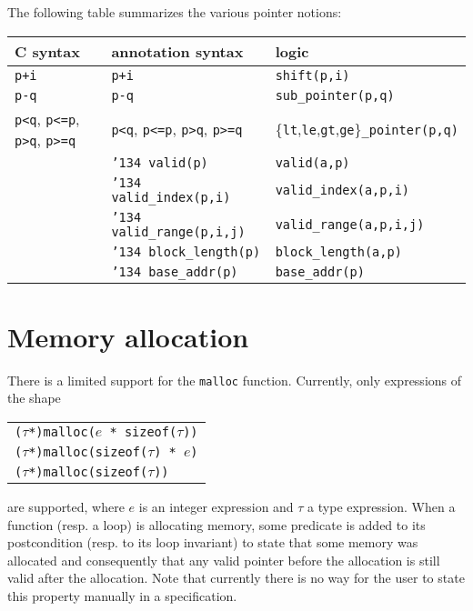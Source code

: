 \documentclass[12pt,a4paper,twoside,openright]{report}
\def\valid{\char'134 valid}
\def\block{\char'134 block}
\def\base{\char'134 base}
\begin{document}
The following table summarizes the various pointer notions:
\begin{center}
  \begin{tabular}{l|l|l}
    C syntax & annotation syntax & logic \\\hline
    \texttt{p+i} & \texttt{p+i} & \texttt{shift(p,i)} \\
    \texttt{p-q} & \texttt{p-q} & \texttt{sub\_pointer(p,q)} \\
    \texttt{p<q}, \texttt{p<=p}, \texttt{p>q}, \texttt{p>=q} & 
    \texttt{p<q}, \texttt{p<=p}, \texttt{p>q}, \texttt{p>=q} &
    \{\texttt{lt},\texttt{le},\texttt{gt},\texttt{ge}\}\texttt{\_pointer(p,q)}
    \\
        & \texttt{\valid(p)} & \texttt{valid(a,p)} \\
        & \texttt{\valid\_index(p,i)} & \texttt{valid\_index(a,p,i)} \\
        & \texttt{\valid\_range(p,i,j)} & \texttt{valid\_range(a,p,i,j)} \\
        & \texttt{\block\_length(p)} & \texttt{block\_length(a,p)} \\
        & \texttt{\base\_addr(p)} & \texttt{base\_addr(p)}
  \end{tabular}
\end{center}

%

\section{Memory allocation}

There is a limited support for the \texttt{malloc} function.
Currently, only expressions of the shape
\begin{center}
  \begin{tabular}{l}
  \texttt{(}$\tau$\texttt{*)malloc(}$e$\texttt{ * sizeof(}$\tau$\texttt{))} \\
  \texttt{(}$\tau$\texttt{*)malloc(sizeof(}$\tau$\texttt{) * }$e$\texttt{)} \\
  \texttt{(}$\tau$\texttt{*)malloc(sizeof(}$\tau$\texttt{))}
  \end{tabular}
\end{center}
are supported, where $e$ is an integer expression and $\tau$ a type
expression. When a function (resp. a loop) is allocating memory, some
predicate is added to its postcondition (resp. to its loop invariant)
to state that some memory was allocated and consequently that any
valid pointer before the allocation is still valid after the allocation.
Note that currently there is no way for the user to state this
property manually in a specification.
\end{document}
